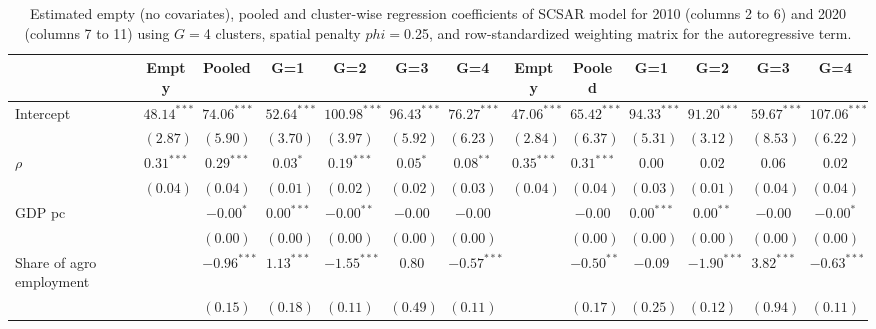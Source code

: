 
\begin{table}
\caption{Estimated empty (no covariates), pooled and cluster-wise regression coefficients of SCSAR model for 2010 (columns 2 to 6) and 2020 (columns 7 to 11) using $G=$4 clusters, spatial penalty $phi=$0.25, and row-standardized weighting matrix for the autoregressive term.}
\begin{center}
\begin{tabular}{l c c c c c c c c c c c c}
\hline
 & Empty & Pooled & G=1 & G=2 & G=3 & G=4 & Empty & Pooled & G=1 & G=2 & G=3 & G=4 \\
\hline
Intercept                         & $48.14^{***}$ & $74.06^{***}$ & $52.64^{***}$ & $100.98^{***}$ & $96.43^{***}$ & $76.27^{***}$ & $47.06^{***}$ & $65.42^{***}$ & $94.33^{***}$ & $91.20^{***}$ & $59.67^{***}$ & $107.06^{***}$ \\
                                  & $(2.87)$      & $(5.90)$      & $(3.70)$      & $(3.97)$       & $(5.92)$      & $(6.23)$      & $(2.84)$      & $(6.37)$      & $(5.31)$      & $(3.12)$      & $(8.53)$      & $(6.22)$       \\
$\rho$                            & $0.31^{***}$  & $0.29^{***}$  & $0.03^{*}$    & $0.19^{***}$   & $0.05^{*}$    & $0.08^{**}$   & $0.35^{***}$  & $0.31^{***}$  & $0.00$        & $0.02$        & $0.06$        & $0.02$         \\
                                  & $(0.04)$      & $(0.04)$      & $(0.01)$      & $(0.02)$       & $(0.02)$      & $(0.03)$      & $(0.04)$      & $(0.04)$      & $(0.03)$      & $(0.01)$      & $(0.04)$      & $(0.04)$       \\
GDP pc                            &               & $-0.00^{*}$   & $0.00^{***}$  & $-0.00^{**}$   & $-0.00$       & $-0.00$       &               & $-0.00$       & $0.00^{***}$  & $0.00^{**}$   & $-0.00$       & $-0.00^{*}$    \\
                                  &               & $(0.00)$      & $(0.00)$      & $(0.00)$       & $(0.00)$      & $(0.00)$      &               & $(0.00)$      & $(0.00)$      & $(0.00)$      & $(0.00)$      & $(0.00)$       \\
Share of agro employment          &               & $-0.96^{***}$ & $1.13^{***}$  & $-1.55^{***}$  & $0.80$        & $-0.57^{***}$ &               & $-0.50^{**}$  & $-0.09$       & $-1.90^{***}$ & $3.82^{***}$  & $-0.63^{***}$  \\
                                  &               & $(0.15)$      & $(0.18)$      & $(0.11)$       & $(0.49)$      & $(0.11)$      &               & $(0.17)$      & $(0.25)$      & $(0.12)$      & $(0.94)$      & $(0.11)$       \\

\end{tabular}
\end{center}
\end{table}
